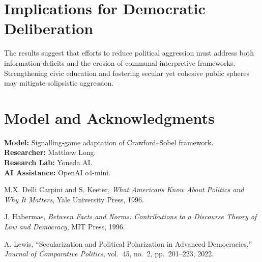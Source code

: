 \documentclass[11pt]{article}
\begin{document}
\section{Implications for Democratic Deliberation}
The results suggest that efforts to reduce political aggression must address both information deficits and the erosion of communal interpretive frameworks. Strengthening civic education and fostering secular yet cohesive public spheres may mitigate solipsistic aggression.

\section*{Model and Acknowledgments}
\noindent\textbf{Model:} Signalling‐game adaptation of Crawford–Sobel framework.\\
\textbf{Researcher:} Matthew Long.\\
\textbf{Research Lab:} Yoneda AI.\\
\textbf{AI Assistance:} OpenAI o4-mini.

\begin{thebibliography}{9}
M.X. Delli Carpini and S. Keeter, \emph{What Americans Know About Politics and Why It Matters}, Yale University Press, 1996.

J. Habermas, \emph{Between Facts and Norms: Contributions to a Discourse Theory of Law and Democracy}, MIT Press, 1996.

A. Lewis, ``Secularization and Political Polarization in Advanced Democracies,'' \emph{Journal of Comparative Politics}, vol.\ 45, no.\ 2, pp.\ 201–223, 2022.
\end{thebibliography}
\end{document}
